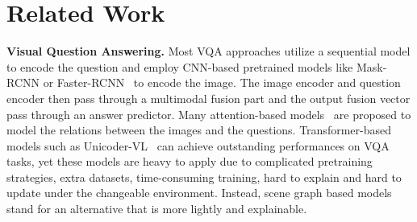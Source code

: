 \documentclass[letterpaper]{article} %
\begin{document}
\section{Related Work}
\noindent\textbf{Visual Question Answering.}
Most VQA approaches utilize a sequential model to encode the question and employ CNN-based pretrained models like Mask-RCNN or Faster-RCNN~\cite{DBLP:conf/cvpr/PatroN18,DBLP:conf/cvpr/NamHK17} to encode the image.
The image encoder and question encoder then pass through a multimodal fusion part and the output fusion vector pass through an answer predictor.
Many attention-based models~\cite{DBLP:conf/cvpr/00010BT0GZ18,DBLP:conf/cvpr/FanZ18,DBLP:conf/eccv/XuS16,DBLP:conf/nips/LuYBP16,DBLP:conf/iclr/HudsonM18} are proposed to model the relations between the images and the questions.
Transformer-based models such as Unicoder-VL~\cite{DBLP:conf/aaai/LiDFGJ20} can achieve outstanding performances on VQA tasks, yet these models are heavy to apply due to complicated pretraining strategies, extra datasets, time-consuming training, hard to explain and hard to update under the changeable environment. 
Instead, scene graph based models stand for an alternative that is more lightly and explainable.
\end{document}
